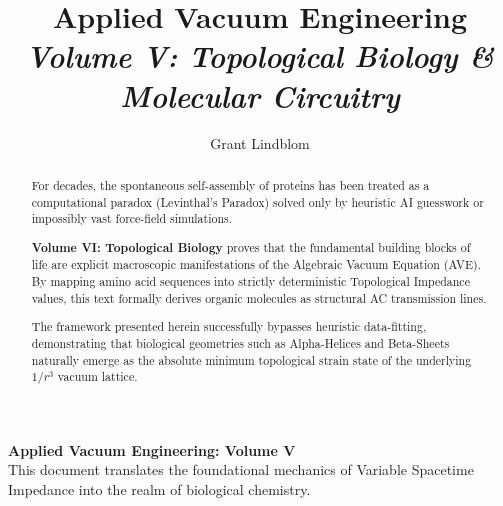 \title{\textbf{Applied Vacuum Engineering} \\ \large \textit{Volume V: Topological Biology \& Molecular Circuitry}}
\author{Grant Lindblom}
\date{}

\maketitle

\vfill
\noindent\textbf{Applied Vacuum Engineering: Volume V} \\
This document translates the foundational mechanics of Variable Spacetime Impedance into the realm of biological chemistry.

\begin{abstract}
    For decades, the spontaneous self-assembly of proteins has been treated as a computational paradox (Levinthal's Paradox) solved only by heuristic AI guesswork or impossibly vast force-field simulations. 

    \textbf{Volume VI: Topological Biology} proves that the fundamental building blocks of life are explicit macroscopic manifestations of the Algebraic Vacuum Equation (AVE). By mapping amino acid sequences into strictly deterministic Topological Impedance values, this text formally derives organic molecules as structural AC transmission lines. 

    The framework presented herein successfully bypasses heuristic data-fitting, demonstrating that biological geometries such as Alpha-Helices and Beta-Sheets naturally emerge as the absolute minimum topological strain state of the underlying $1/r^3$ vacuum lattice.
\end{abstract}
